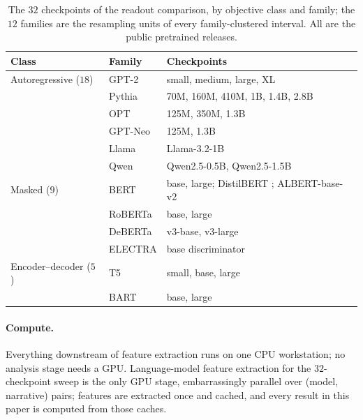 \documentclass{article}
\begin{document}
\begin{table}[t]
\centering\small
\caption{The $32$ checkpoints of the readout comparison, by objective class and family; the
$12$ families are the resampling units of every family-clustered interval. All are the public pretrained releases.}
\label{tab:checkpoints}
\begin{tabular}{@{}llp{6.4cm}@{}}
\toprule
Class & Family & Checkpoints \\
\midrule
Autoregressive ($18$) & GPT-2 \citep{radford2019language} & small, medium, large, XL \\
 & Pythia \citep{biderman2023pythia} & 70M, 160M, 410M, 1B, 1.4B, 2.8B \\
 & OPT \citep{zhang2022opt} & 125M, 350M, 1.3B \\
 & GPT-Neo \citep{black2021gptneo} & 125M, 1.3B \\
 & Llama \citep{grattafiori2024llama3} & Llama-3.2-1B \citep{meta2024llama32} \\
 & Qwen \citep{qwen2024qwen25} & Qwen2.5-0.5B, Qwen2.5-1.5B \\
\midrule
Masked ($9$) & BERT \citep{devlin2019bert} & base, large; DistilBERT \citep{sanh2019distilbert}; ALBERT-base-v2 \citep{lan2020albert} \\
 & RoBERTa \citep{liu2019roberta} & base, large \\
 & DeBERTa \citep{he2023debertav3} & v3-base, v3-large \\
 & ELECTRA \citep{clark2020electra} & base discriminator \\
\midrule
Encoder--decoder ($5$) & T5 \citep{raffel2020t5} & small, base, large \\
 & BART \citep{lewis2020bart} & base, large \\
\bottomrule
\end{tabular}
\end{table}

\paragraph{Compute.} Everything downstream of feature extraction runs on one CPU workstation; no
analysis stage needs a GPU. Language-model feature extraction for the $32$-checkpoint sweep is the
only GPU stage, embarrassingly parallel over (model, narrative) pairs; features are extracted once
and cached, and every result in this paper is computed from those caches.
\end{document}
